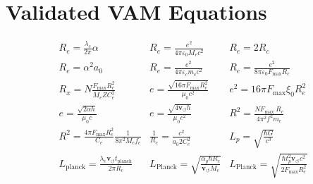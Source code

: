 \documentclass[a4paper,10pt]{article}
\begin{document}
    \section*{Validated VAM Equations}\label{sec:validated-vam-equations}
    \begin{equation*}
        \begin{array}{ccc}
            R_e = \frac{\lambda_c}{2 \pi} \alpha & R_e = \frac{e^2}{4 \pi \varepsilon_0 M_e c^2} & R_e = 2 R_c \\
            R_e = \alpha^2 a_0 & R_e = \frac{e^2}{4 \pi \varepsilon_c m_c c^2} & R_e = \frac{e^2}{8 \pi \varepsilon_0 F_{\max} R_c} \\
            R_x = N \frac{F_{\max} R_c^2}{M_e Z C_e^2} & e = \frac{\sqrt{16 \pi F_{\max} R_c^2}}{\mu_0 c^2} & e^2 = 16 \pi F_{\max} \xi_0 R_e^2 \\
            e = \frac{\sqrt{2 \alpha h}}{\mu_0 c} & e = \frac{\sqrt{4 \mathbf{v}_{\scriptscriptstyle\boldsymbol{\circlearrowleft}} h}}{\mu_0 c^2} & R^2 = \frac{N F_{\text {max }} R_c}{4 \pi^2 f^2 m_e} \\
            R^2 = \frac{4 \pi F_{\max} R_c^2}{C_e} \frac{1}{8 \pi^2 M_e f_e} & \frac{1}{R_c} = \frac{c^2}{a_0 2 C_e^2} & {L_p} = \sqrt{\frac{\hbar G}{c^3}} \\
            L_{\mathrm{planck}} = \frac{\lambda_e \mathbf{v}_{\scriptscriptstyle\boldsymbol{\circlearrowleft}} t_{\mathrm{planck}}}{2 \pi R_c} & L_\text{Planck} = \sqrt{\frac{\alpha_g \hbar R_c}{\mathbf{v}_{\scriptscriptstyle\boldsymbol{\circlearrowleft}} M_e}} & L_\text{Planck} = \sqrt{\frac{\hbar t_p^2 \mathbf{v}_{\scriptscriptstyle\boldsymbol{\circlearrowleft}} c^2}{2 F_{\max} R_c^2}} \\
        \end{array}
    \end{equation*}
\end{document}
